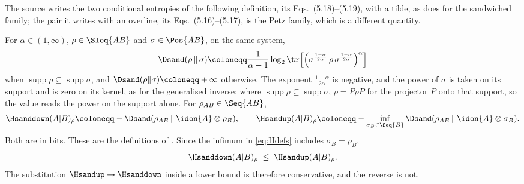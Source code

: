 
The source \cite[Def.~5.2]{tomamichel2016finite} writes the two conditional
entropies of the following definition, its Eqs.~(5.18)--(5.19), with a
tilde, as  does for the sandwiched family; the
pair it writes with an overline, its Eqs.~(5.16)--(5.17), is the Petz
family, which is a different quantity.

\begin{definition}
\label{def:renyi}
For $\alpha\in(1,\infty)$, $\rho\in\Sleq{AB}$ and $\sigma\in\Pos{AB}$, on the
same system,
\begin{equation}\label{eq:sandwiched}
  \Dsand(\rho\,\|\,\sigma)\coloneqq\frac{1}{\alpha-1}\log_2
  \tr\!\left[\left(\sigma^{\frac{1-\alpha}{2\alpha}}\,\rho\,
  \sigma^{\frac{1-\alpha}{2\alpha}}\right)^{\alpha}\right]
\end{equation}
when $\operatorname{supp}\rho\subseteq\operatorname{supp}\sigma$, and
$\Dsand(\rho\|\sigma)\coloneqq+\infty$ otherwise. The exponent
$\frac{1-\alpha}{2\alpha}$ is negative, and the power of $\sigma$ is taken on
its support and is zero on its kernel, as for the generalised inverse; where
$\operatorname{supp}\rho\subseteq\operatorname{supp}\sigma$, $\rho=P\rho P$
for the projector $P$ onto that support, so the value reads the power on the
support alone. For
$\rho_{AB}\in\Seq{AB}$,
\begin{equation}\label{eq:Hdefs}
  \Hsanddown(A|B)_{\rho}\coloneqq-\Dsand(\rho_{AB}\,\|\,\idon{A}\otimes\rho_B),
  \qquad
  \Hsandup(A|B)_{\rho}\coloneqq-\inf_{\sigma_B\in\Seq{B}}
  \Dsand(\rho_{AB}\,\|\,\idon{A}\otimes\sigma_B).
\end{equation}
Both are in bits. These are the definitions of
\cite[Def.~5.2, Eqs.~(5.18)--(5.19)]{tomamichel2016finite}. Since the
infimum in \eqref{eq:Hdefs} includes $\sigma_B=\rho_B$,
\begin{equation}\label{eq:arrow-order}
  \Hsanddown(A|B)_{\rho}\;\le\;\Hsandup(A|B)_{\rho}.
\end{equation}
The substitution $\Hsandup\to\Hsanddown$ inside a lower bound is therefore
conservative, and the reverse is not.
\end{definition}
